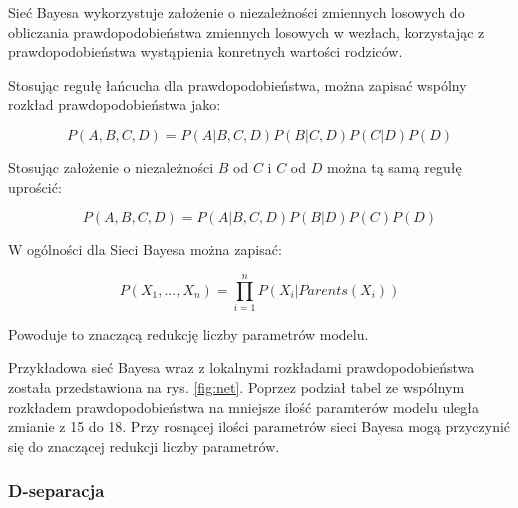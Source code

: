 \documentclass{article}
\begin{document}
Sieć Bayesa wykorzystuje założenie o niezależności zmiennych losowych do obliczania prawdopodobieństwa zmiennych losowych w wezłach, korzystając z prawdopodobieństwa wystąpienia konretnych wartości rodziców. 

Stosując regułę łańcucha dla prawdopodobieństwa, można zapisać wspólny rozkład prawdopodobieństwa jako:

\begin{equation}
	P(A, B, C, D) = P(A|B, C, D)P(B|C, D)P(C|D)P(D)
\end{equation}

Stosując założenie o niezależności $B$ od $C$ i $C$ od $D$ można tą samą regułę uprościć:

\begin{equation}
	P(A, B, C, D) = P(A|B, C, D)P(B|D)P(C)P(D)
\end{equation}

W ogólności dla Sieci Bayesa można zapisać:

\begin{equation}
	P(X_1, ... , X_n) = \prod_{i=1}^{n} P(X_i|Parents(X_i))
\end{equation}

Powoduje to znaczącą redukcję liczby parametrów modelu.

Przykładowa sieć Bayesa wraz z lokalnymi rozkładami prawdopodobieństwa została przedstawiona na rys. \ref{fig:net}. Poprzez podział tabel ze wspólnym rozkładem prawdopodobieństwa na mniejsze ilość paramterów modelu uległa zmianie z 15 do 18. Przy rosnącej ilości parametrów sieci Bayesa mogą przyczynić się do znaczącej redukcji liczby parametrów.

\subsubsection{D-separacja}
\end{document}
